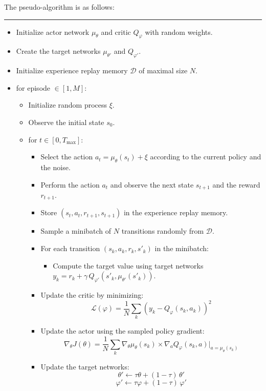 \documentclass[
  letterpaper,
  DIV=11,
  numbers=noendperiod]{scrreprt}
\providecommand{\tightlist}{%
  \setlength{\itemsep}{0pt}\setlength{\parskip}{0pt}}\usepackage{longtable,booktabs,array}
\begin{document}
The pseudo-algorithm is as follows:

\begin{center}\rule{0.5\linewidth}{0.5pt}\end{center}

\begin{itemize}
\item
  Initialize actor network \(\mu_{\theta}\) and critic \(Q_\varphi\)
  with random weights.
\item
  Create the target networks \(\mu_{\theta'}\) and \(Q_{\varphi'}\).
\item
  Initialize experience replay memory \(\mathcal{D}\) of maximal size
  \(N\).
\item
  for episode \(\in [1, M]\):

  \begin{itemize}
  \tightlist
  \item
    Initialize random process \(\xi\).
  \item
    Observe the initial state \(s_0\).
  \item
    for \(t \in [0, T_\text{max}]\):

    \begin{itemize}
    \item
      Select the action \(a_t = \mu_\theta(s_t) + \xi\) according to the
      current policy and the noise.
    \item
      Perform the action \(a_t\) and observe the next state \(s_{t+1}\)
      and the reward \(r_{t+1}\).
    \item
      Store \((s_t, a_t, r_{t+1}, s_{t+1})\) in the experience replay
      memory.
    \item
      Sample a minibatch of \(N\) transitions randomly from
      \(\mathcal{D}\).
    \item
      For each transition \((s_k, a_k, r_k, s'_k)\) in the minibatch:

      \begin{itemize}
      \tightlist
      \item
        Compute the target value using target networks
        \(y_k = r_k + \gamma \, Q_{\varphi'}(s'_k, \mu_{\theta'}(s'_k))\).
      \end{itemize}
    \item
      Update the critic by minimizing: \[
        \mathcal{L}(\varphi) = \frac{1}{N} \sum_k (y_k - Q_\varphi(s_k, a_k))^2
        \]
    \item
      Update the actor using the sampled policy gradient: \[
        \nabla_\theta J(\theta) = \frac{1}{N} \sum_k \nabla_\theta \mu_\theta(s_k) \times \nabla_a Q_\varphi(s_k, a) |_{a = \mu_\theta(s_k)}
        \]
    \item
      Update the target networks:
      \[\theta' \leftarrow \tau \theta + (1-\tau) \, \theta'\]
      \[\varphi' \leftarrow \tau \varphi + (1-\tau) \, \varphi'\]
    \end{itemize}
  \end{itemize}
\end{itemize}
\end{document}
